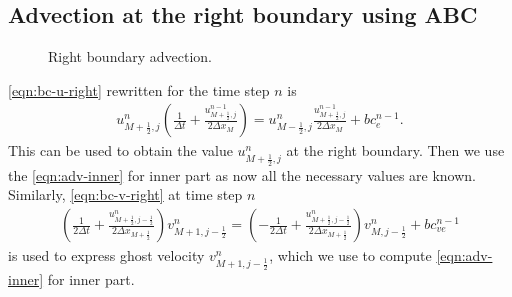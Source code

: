 \documentclass{article}
\numberwithin{equation}{section}
\begin{document}
\subsection{Advection at the right boundary using ABC}\label{subsec:advection-ABC}
\begin{figure}[H] %
  \caption{Right boundary advection.}\label{fig:ADV-right}
\end{figure}
\cref{eqn:bc-u-right} rewritten for the time step $n$ is
\begin{equation*}
\begin{gathered}
{{u}^{n}_{M+\frac{1}{2},j}}\left(\frac{1}{\Delta t} + \frac{u^{n-1}_{M+\frac{1}{2},j}}{2\Delta x_M}\right)
=
u^{n}_{M-\frac{1}{2},j}\frac{u^{n-1}_{M+\frac{1}{2},j}}{2\Delta x_M}+bc_e^{n-1}.
\end{gathered}
\end{equation*}
This can be used to obtain the value $u^{n}_{M+\frac{1}{2},j}$ at the right boundary. Then we use the \cref{eqn:adv-inner} for inner part as now all the necessary values are known. Similarly, \cref{eqn:bc-v-right} at time step $n$
\begin{equation*}
\begin{gathered}
\left( \frac{1}{2\Delta t} + \frac{u^n_{M+\frac{1}{2},j-\frac{1}{2}}}{2\Delta x_{M+\frac{1}{2}}}\right) v^{n}_{M+1,j-\frac{1}{2}}
=\left( -\frac{1}{2\Delta t}+\frac{u^n_{M+\frac{1}{2},j-\frac{1}{2}}}{2\Delta x_{M+\frac{1}{2}}} \right)v^{n}_{M,j-\frac{1}{2}}+bc_{ve}^{n-1}
\end{gathered}
\end{equation*}
is used to express ghost velocity $v^{n}_{M+1,j-\frac{1}{2}}$, which we use to compute \cref{eqn:adv-inner} for inner part.
\end{document}
